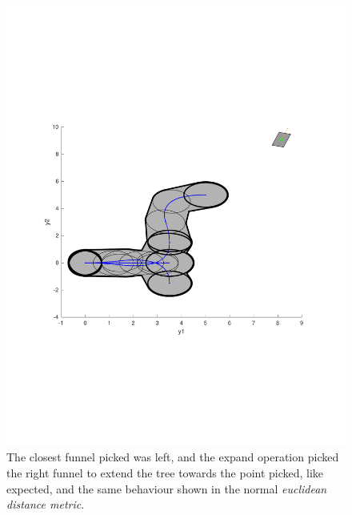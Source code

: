 \begin{figure}
  \includegraphics[scale=.5]{figures/rrtfunnel/modified-euclidean-distance-closest-funnel2}
  \caption{The closest funnel picked was left, and the expand operation picked
    the right funnel to extend the tree towards the point picked, like expected,
  and the same behaviour shown in the normal \textit{euclidean distance metric}.}
\end{figure}


